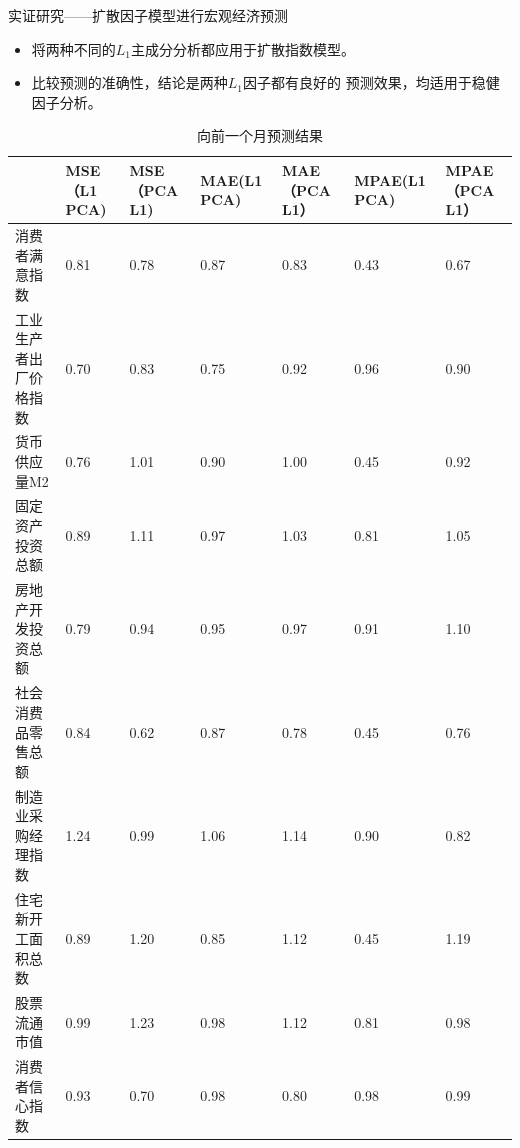 \begin{frame}{实证研究——扩散因子模型进行宏观经济预测}
    \begin{itemize}
        \item 将两种不同的$L_1$主成分分析都应用于扩散指数模型。
        \item 比较预测的准确性，结论是两种$L_1$因子都有良好的
        预测效果，均适用于稳健因子分析。
    \end{itemize} 

    \begin{table}[H]
        \centering
        \tiny
        \caption{向前一个月预测结果}
        \label{outcome4}
        \begin{tabularx}{\textwidth}{lXXXXXX}
        \toprule
                     &  MSE（L1 PCA) &  MSE（PCA L1) &  MAE(L1 PCA) &  MAE（PCA L1） &  MPAE(L1 PCA) &  MPAE（PCA L1） \\ \midrule
        消费者满意指数     & 0.81            & 0.78        & 0.87            & 0.83        & 0.43             & 0.67         \\
        工业生产者出厂价格指数 & 0.70            & 0.83        & 0.75            & 0.92       & 0.96             & 0.90         \\
        货币供应量M2      & 0.76            & 1.01        & 0.90            & 1.00       & 0.45             & 0.92         \\
        固定资产投资总额  & 0.89            & 1.11        & 0.97            & 1.03        & 0.81             & 1.05         \\
        房地产开发投资总额 & 0.79            & 0.94        & 0.95            & 0.97        & 0.91             & 1.10         \\
        社会消费品零售总额 & 0.84            & 0.62        & 0.87            & 0.78        & 0.45             & 0.76         \\
        制造业采购经理指数    & 1.24            & 0.99        & 1.06            & 1.14        & 0.90             & 0.82         \\
        住宅新开工面积总数  & 0.89            & 1.20        & 0.85            & 1.12        & 0.45             & 1.19         \\
        股票流通市值     & 0.99            & 1.23        & 0.98            & 1.12        & 0.81             & 0.98         \\
        消费者信心指数     & 0.93            & 0.70        & 0.98            & 0.80        & 0.98             & 0.99         \\ \bottomrule
        \end{tabularx}
    \end{table}
\end{frame}


